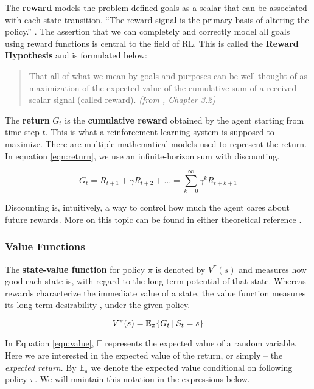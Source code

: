 The \textbf{reward} models the problem-defined goals as a scalar that can be associated with each state transition.
``The reward signal is the primary basis of altering the policy.'' \cite{rlai}.
The assertion that we can completely and correctly model all goals using reward functions is central to the field of RL.
This is called the \textbf{Reward Hypothesis} and is formulated below:
\begin{quotation}
    That all of what we mean by goals and purposes can be well thought of as maximization of the expected value of the cumulative sum of a received scalar signal (called reward). \textit{(from \cite{rlai}, Chapter 3.2)}
\end{quotation}

The \textbf{return} \(G_t\) is the \textbf{cumulative reward} obtained by the agent starting from time step \(t\).
This is what a reinforcement learning system is supposed to maximize.
There are multiple mathematical models used to represent the return.
In equation \ref{eqn:return}, we use an infinite-horizon sum with discounting.

\begin{equation} \label{eqn:return}
    G_t = R_{t+1} + \gamma R_{t+2} + \dots = \sum_{k = 0}^{\infty}{\gamma^{k} R_{t + k + 1}}    
\end{equation}

Discounting is, intuitively, a way to control how much the agent cares about future rewards.
More on this topic can be found in either theoretical reference \cite{rlai, silver-lectures}.


\subsubsection{Value Functions} \label{rl:value-func}
The \textbf{state-value function} for policy \(\pi\) is denoted by \(V^{\pi}(s)\) and measures how good each state is, with regard to the long-term potential of that state.
Whereas rewards characterize the immediate value of a state, the value function measures its long-term desirability \cite{rlai}, under the given policy.

\begin{equation} \label{eqn:value}
    V^{\pi}(s) = \mathbb{E}_{\pi}\{ G_t \:\vert\: S_t = s \}
\end{equation}

In Equation \ref{eqn:value}, \(\mathbb{E}\) represents the expected value of a random variable. Here we are interested in the expected value of the return, or simply -- the \emph{expected return}.
By \(\mathbb{E}_{\pi}\) we denote the expected value conditional on following policy \(\pi\).
We will maintain this notation in the expressions below.

